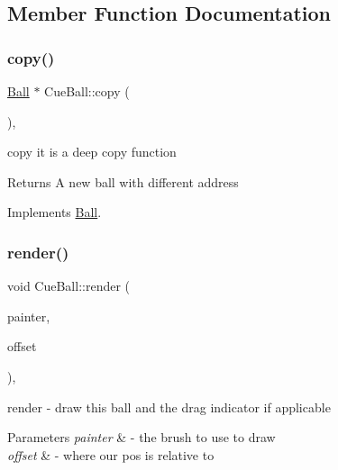 \subsection{Member Function Documentation}
\mbox{\label{class_cue_ball_a9c2d69ffe6892cba695ef34e360b5dae}} 
\subsubsection{\texorpdfstring{copy()}{copy()}}
{\footnotesize\ttfamily \mbox{\hyperlink{class_ball}{Ball}} $\ast$ Cue\+Ball\+::copy (\begin{DoxyParamCaption}{ }\end{DoxyParamCaption})\hspace{0.3cm}{\ttfamily [override]}, {\ttfamily [virtual]}}



copy it is a deep copy function 

\begin{DoxyReturn}{Returns}
A new ball with different address 
\end{DoxyReturn}


Implements \mbox{\hyperlink{class_ball_ae6c0731fabb7a45ba36df62a1975661a}{Ball}}.

\mbox{\label{class_cue_ball_a915a83205e4cfc720fbd884b045e2f81}} 
\subsubsection{\texorpdfstring{render()}{render()}}
{\footnotesize\ttfamily void Cue\+Ball\+::render (\begin{DoxyParamCaption}\item[{Q\+Painter \&}]{painter,  }\item[{const Q\+Vector2D \&}]{offset }\end{DoxyParamCaption})\hspace{0.3cm}{\ttfamily [override]}, {\ttfamily [virtual]}}



render -\/ draw this ball and the drag indicator if applicable 


\begin{DoxyParams}{Parameters}
{\em painter} & -\/ the brush to use to draw \\
\hline
{\em offset} & -\/ where our pos is relative to \\
\hline
\end{DoxyParams}


